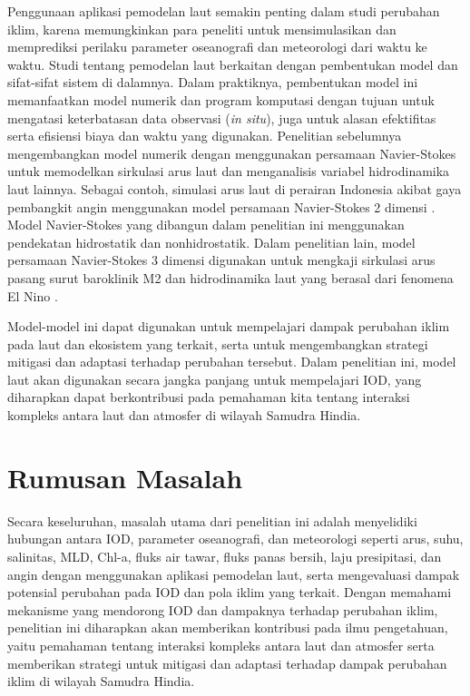 \begin{spacing}{1.5}
	Penggunaan aplikasi pemodelan laut semakin penting dalam studi perubahan iklim, karena memungkinkan para peneliti untuk mensimulasikan dan memprediksi perilaku parameter oseanografi dan meteorologi dari waktu ke waktu. Studi tentang pemodelan laut berkaitan dengan pembentukan model dan sifat-sifat sistem di dalamnya. Dalam praktiknya, pembentukan model ini memanfaatkan model numerik dan program komputasi dengan tujuan untuk mengatasi keterbatasan data observasi (\textit{in situ}), juga untuk alasan efektifitas serta efisiensi biaya dan waktu yang digunakan. Penelitian sebelumnya mengembangkan model numerik dengan menggunakan persamaan Navier-Stokes untuk memodelkan sirkulasi arus laut dan menganalisis variabel hidrodinamika laut lainnya. Sebagai contoh, simulasi arus laut di perairan Indonesia akibat gaya pembangkit angin menggunakan model persamaan Navier-Stokes 2 dimensi \cite{Rizal2018,Ikhwan2019,Haditiar2019}. Model Navier-Stokes yang dibangun dalam penelitian ini menggunakan pendekatan hidrostatik dan nonhidrostatik. Dalam penelitian lain, model persamaan Navier-Stokes 3 dimensi digunakan untuk mengkaji sirkulasi arus pasang surut baroklinik M2 dan hidrodinamika laut yang berasal dari fenomena El Nino \cite{Rizal2010,Haditiar2020,Ikhwan2021}.
	
	Model-model ini dapat digunakan untuk mempelajari dampak perubahan iklim pada laut dan ekosistem yang terkait, serta untuk mengembangkan strategi mitigasi dan adaptasi terhadap perubahan tersebut. Dalam penelitian ini, model laut akan digunakan secara jangka panjang untuk mempelajari IOD, yang diharapkan dapat berkontribusi pada pemahaman kita tentang interaksi kompleks antara laut dan atmosfer di wilayah Samudra Hindia. 
	
	\section[Rumusan Masalah]{Rumusan Masalah}
	Secara keseluruhan, masalah utama dari penelitian ini adalah menyelidiki hubungan antara IOD, parameter oseanografi, dan meteorologi seperti arus, suhu, salinitas, MLD, Chl-a, fluks air tawar, fluks panas bersih, laju presipitasi, dan angin dengan menggunakan aplikasi pemodelan laut, serta mengevaluasi dampak potensial perubahan pada IOD dan pola iklim yang terkait. Dengan memahami mekanisme yang mendorong IOD dan dampaknya terhadap perubahan iklim, penelitian ini diharapkan akan memberikan kontribusi pada ilmu pengetahuan, yaitu pemahaman tentang interaksi kompleks antara laut dan atmosfer serta memberikan strategi untuk mitigasi dan adaptasi terhadap dampak perubahan iklim di wilayah Samudra Hindia.


\end{spacing}
